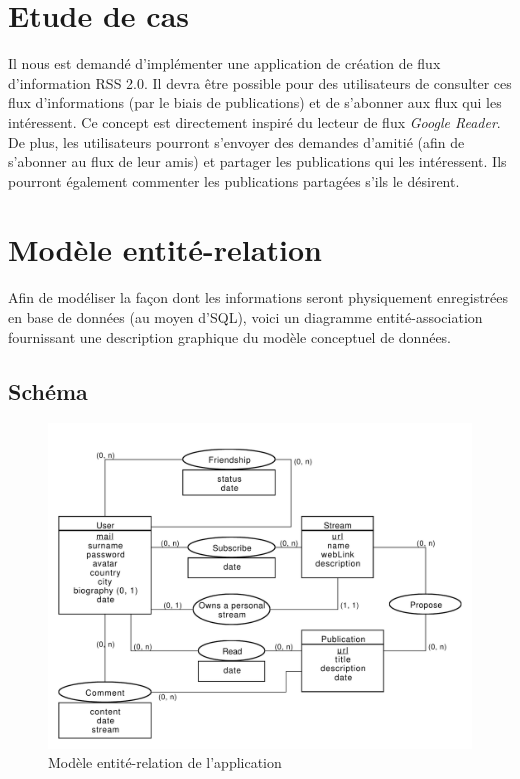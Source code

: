\documentclass[a4paper,10pt]{article}
\begin{document}
\tableofcontents
\pagebreak

\section{Etude de cas}

Il nous est demandé d'implémenter une application de création de flux d'information RSS 2.0. Il devra être possible pour des utilisateurs de consulter ces flux d'informations (par le biais de publications) et de s'abonner aux flux qui les intéressent. Ce concept est directement inspiré du lecteur de flux \textsl{Google Reader}. De plus, les utilisateurs pourront s'envoyer des demandes d'amitié (afin de s'abonner au flux de leur amis) et partager les publications qui les intéressent. Ils pourront également commenter les publications partagées s'ils le désirent. 

\section{Modèle entité-relation}

Afin de modéliser la façon dont les informations seront physiquement enregistrées en base de données (au moyen d'SQL), voici un diagramme entité-association fournissant une description graphique du modèle conceptuel de données.

\subsection{Schéma}

	\begin{figure}[h!]
	    \centering
	    \includegraphics[width=15cm]{Entite-Relation-2.pdf}
	    \caption{Modèle entité-relation de l'application}
	    \label{fig:Entite-Relation}
	\end{figure}
\end{document}
